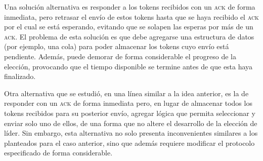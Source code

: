 \documentclass[a4paper]{article}
\newcommand{\acr}[1]{\textsc{\lowercase{#1}}}
\begin{document}
Una solución alternativa es responder a los tokens recibidos con un \acr{ACK}
de forma inmediata, pero retrasar el envío de estos tokens hasta que se haya
recibido el \acr{ACK} por el cual se está esperando, evitando que se solapen
las esperas por más de un \acr{ACK}. El problema de esta solución es que debe
agregarse una estructura de datos (por ejemplo, una cola) para poder
almacenar los tokens cuyo envío está pendiente. Además, puede demorar de forma
considerable el progreso de la elección, provocando que el tiempo disponible
se termine antes de que esta haya finalizado.

Otra alternativa que se estudió, en una línea similar a la idea anterior, es
la de responder con un \acr{ACK} de forma inmediata pero, en lugar de
almacenar todos los tokens recibidos para su posterior envío, agregar lógica
que permita seleccionar y enviar solo uno de ellos, de una forma que no altere
el desarrollo de la elección de líder. Sin embargo, esta alternativa no solo
presenta inconvenientes similares a los planteados para el caso anterior, sino
que además requiere modificar el protocolo especificado de forma considerable.
\end{document}
